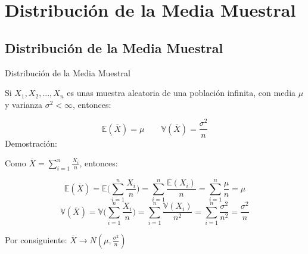 \documentclass[
  ignorenonframetext,
]{beamer}
\begin{document}
\hypertarget{distribuciuxf3n-de-la-media-muestral}{%
\section{Distribución de la Media
Muestral}\label{distribuciuxf3n-de-la-media-muestral}}

\hypertarget{distribuciuxf3n-de-la-media-muestral-1}{%
\subsection{Distribución de la Media
Muestral}\label{distribuciuxf3n-de-la-media-muestral-1}}

\begin{frame}{Distribución de la Media Muestral}

\justifying Si \(X_1,X_2,...,X_n\) es unas muestra aleatoria de una
población infinita, con media \(\mu\) y varianza \(\sigma^2<\infty\),
entonces:

\[\mathbb{E}(\overline{X} )=\mu \quad\quad \mathbb{V}(\overline{X} )=\frac{\sigma^2}{n} \]
Demostración:

Como \(\overline{X}=\displaystyle \sum_{i=1}^{n}\frac{X_i}{n}\),
entonces:

\[\mathbb{E}(\overline{X} )  = \mathbb{E}\bigg(\displaystyle\sum_{i=1}^{n}\frac{X_i}{n} \bigg )=\displaystyle \sum_{i=1}^{n}\frac{\mathbb{E} (X_i)}{n}= \displaystyle \sum_{i=1}^{n}\frac{\mu}{n}= \mu\]
\[\mathbb{V}(\overline{X} )= \mathbb{V}\bigg(\displaystyle \sum_{i=1}^{n}\frac{X_i}{n} \bigg) = \displaystyle \sum_{i=1}^{n}\frac{\mathbb{V} (X_i)}{n^2}  = \displaystyle \sum_{i=1}^{n}\frac{\sigma^2}{n^2}=\displaystyle\frac{\sigma^2}{n}\]

Por consiguiente:
\(\overline{X} \longrightarrow N(\mu, \displaystyle \frac{\sigma^2}{n})\)

\end{frame}

\hypertarget{section-3}{%
\subsection{}\label{section-3}}
\end{document}
